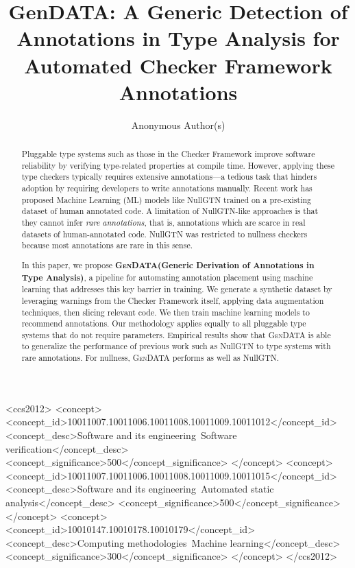 \documentclass[acmsmall,screen,review,anonymous]{acmart}
\newcommand{\gendata}{\textsc{GenDATA}\xspace}
\begin{document}
\title{GenDATA: A Generic Detection of Annotations in Type Analysis for Automated Checker Framework Annotations}


\author{Anonymous Author(s)}

\begin{abstract}
Pluggable type systems such as those in the Checker Framework improve software reliability by verifying type-related properties at compile time. However, applying these type checkers typically requires extensive annotations---a tedious task that hinders adoption by requiring developers to write annotations manually. Recent work has proposed Machine Learning (ML) models like NullGTN trained on a pre-existing dataset of human annotated code. A limitation of NullGTN-like approaches is that they cannot infer \emph{rare annotations}, that is, annotations which are scarce in real datasets of human-annotated code. NullGTN was restricted to nullness checkers because most annotations are rare in this sense.

In this paper, we propose \textbf{\gendata (Generic Derivation of Annotations in Type Analysis)}, a pipeline for automating annotation placement using machine learning that addresses this key barrier in training. We generate a synthetic dataset by leveraging warnings from the Checker Framework itself, applying data augmentation techniques, then slicing relevant code. We then train machine learning models to recommend annotations. Our methodology applies equally to all pluggable type systems that do not require parameters. Empirical results show that \gendata is able to generalize the performance of previous work such as NullGTN to type systems with rare annotations. For nullness, \gendata performs as well as NullGTN.
\end{abstract}

\begin{CCSXML}
<ccs2012>
   <concept>
       <concept_id>10011007.10011006.10011008.10011009.10011012</concept_id>
       <concept_desc>Software and its engineering~Software verification</concept_desc>
       <concept_significance>500</concept_significance>
   </concept>
   <concept>
       <concept_id>10011007.10011006.10011008.10011009.10011015</concept_id>
       <concept_desc>Software and its engineering~Automated static analysis</concept_desc>
       <concept_significance>500</concept_significance>
   </concept>
   <concept>
       <concept_id>10010147.10010178.10010179</concept_id>
       <concept_desc>Computing methodologies~Machine learning</concept_desc>
       <concept_significance>300</concept_significance>
   </concept>
</ccs2012>
\end{CCSXML}
\end{document}
